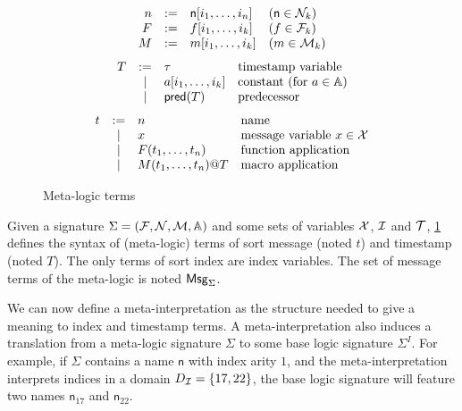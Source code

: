 \begin{figure}
\[
  \begin{array}{rcll}
    n &:=& \mathsf{n}[i_1,\ldots,i_n] & (\mathsf{n}\in\mathcal{N}_k)
    \\
    F &:=& f[i_1,\ldots,i_k] & (f\in\mathcal{F}_k)
    \\
    M &:=& m[i_1,\ldots,i_k] & (m\in\mathcal{M}_k)
  \end{array}
\]
\[
  \begin{array}{rcll}
    T &:=& \tau & \text{timestamp variable} \\
      &\mid& a[i_1,\ldots,i_k] & \text{constant (for $a\in\mathbb{A}$)} \\
      &\mid & \textsf{pred}(T) & \text{predecessor}
\end{array}
   \]
\[
     \begin{array}{rcll}
    t & := & n &\text{name} \\
    & \mid & x  & \text{message variable $x\in\mathcal{X}$} \\
    & \mid & F(t_1,\dots,t_n) &\text{function application}\\
    & \mid & M(t_1,\ldots,t_n)@T &\text{macro application}\\
       \end{array}
     \]
     \caption{Meta-logic terms}\label{fig:terms}
\end{figure}

\begin{definition}
  Given a signature $\Sigma = (\mathcal{F},\mathcal{N},\mathcal{M},\mathbb{A})$ and some sets of variables
  $\mathcal{X}$, $\mathcal{I}$ and $\mathcal{T}$,
  \cref{fig:terms} defines the syntax of (meta-logic) terms
  of sort message (noted $t$) and timestamp (noted $T$).
  The only terms of sort index are index variables.
  The set of message terms of the meta-logic is noted $\mathsf{Msg}_\Sigma$.
\end{definition}

We can now define a meta-interpretation as the structure needed to
give a meaning to index and timestamp terms. A meta-interpretation
also induces a translation from a meta-logic signature $\Sigma$
to some base logic signature $\Sigma^I$. For example, if
$\Sigma$ contains a name $\mathsf{n}$ with index arity $1$, and
the meta-interpretation interprets indices in a domain $D_{\mathcal{I}} = \{
  17, 22 \}$, the base logic signature will feature
two names $\mathsf{n}_{17}$ and $\mathsf{n}_{22}$.


